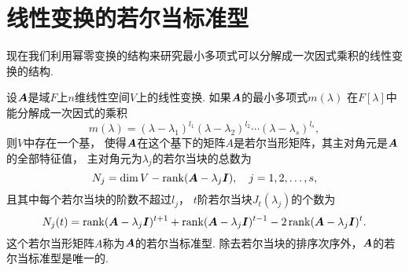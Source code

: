 \section{线性变换的若尔当标准型}
现在我们利用幂零变换的结构来研究最小多项式可以分解成一次因式乘积的线性变换的结构.
\begin{theorem}
设\(\boldsymbol{A}\)是域\(F\)上\(n\)维线性空间\(V\)上的线性变换.
如果\(\boldsymbol{A}\)的最小多项式\(m(\lambda)\)
在\(F[\lambda]\)中能分解成一次因式的乘积\begin{equation*}
	m(\lambda)
	= (\lambda-\lambda_1)^{l_1}
	(\lambda-\lambda_2)^{l_2}
	\dotsm
	(\lambda-\lambda_s)^{l_s},
\end{equation*}
则\(V\)中存在一个基，
使得\(\boldsymbol{A}\)在这个基下的矩阵\(A\)是若尔当形矩阵，其主对角元是\(\boldsymbol{A}\)的全部特征值，
主对角元为\(\lambda_j\)的若尔当块的总数为\begin{equation*}
	N_j = \dim V - \rank(\boldsymbol{A}-\lambda_j\boldsymbol{I}),
	\quad j=1,2,\dotsc,s,
\end{equation*}
且其中每个若尔当块的阶数不超过\(l_j\)，
\(t\)阶若尔当块\(J_t(\lambda_j)\)的个数为\begin{equation*}
	N_j(t)
	= \rank(\boldsymbol{A}-\lambda_j\boldsymbol{I})^{t+1}
	+ \rank(\boldsymbol{A}-\lambda_j\boldsymbol{I})^{t-1}
	- 2 \rank(\boldsymbol{A}-\lambda_j\boldsymbol{I})^t.
\end{equation*}
\rm
这个若尔当形矩阵\(A\)称为\(\boldsymbol{A}\)的若尔当标准型.
除去若尔当块的排序次序外，\(\boldsymbol{A}\)的若尔当标准型是唯一的.
\end{theorem}
